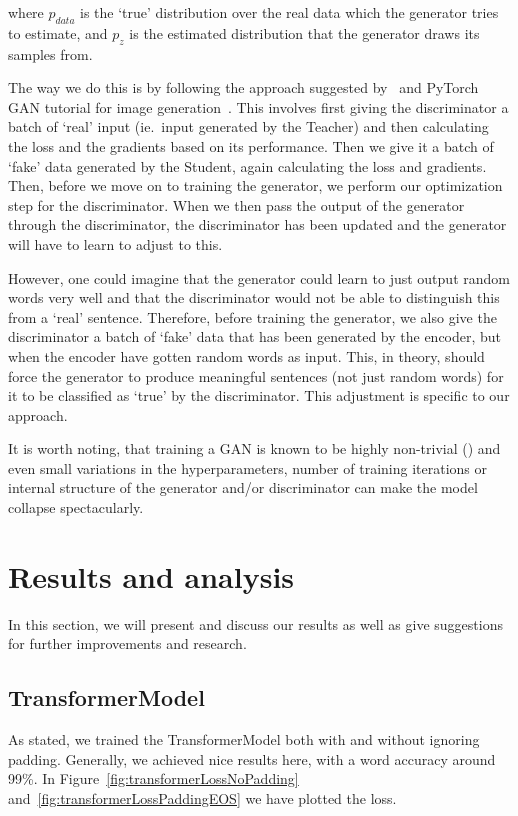 \documentclass{article}
\begin{document}
where $p_{data}$ is the `true' distribution over the real data which the
generator tries to estimate, and $p_z$ is the estimated distribution that the
generator draws its samples from.

The way we do this is by following the approach suggested
by~\cite{Goodfellow2014GenerativeAN} and PyTorch GAN tutorial for image
generation~\cite{pytorchTutorialGAN}. This involves first giving the
discriminator a batch of `real' input (ie.\ input generated by the Teacher) and
then calculating the loss and the gradients based on its performance. Then we
give it a batch of `fake' data generated by the Student, again calculating the
loss and gradients. Then, before we move on to training the generator, we
perform our optimization step for the discriminator. When we then pass the
output of the generator through the discriminator, the discriminator has been
updated and the generator will have to learn to adjust to this. 

However, one could imagine that the generator could learn to just output random
words very well and that the discriminator would not be able to distinguish this
from a `real' sentence. Therefore, before training the generator, we also give
the discriminator a batch of `fake' data that has been generated by the encoder,
but when the encoder have gotten random words as input. This, in theory, should
force the generator to produce meaningful sentences (not just random words) for
it to be classified as `true' by the discriminator. This adjustment is specific to
our approach.

It is worth noting, that training a GAN is known to be highly non-trivial
(\cite{Hui2018}) and even small variations in the hyperparameters, number of training
iterations or internal structure of the generator and/or discriminator can make
the model collapse spectacularly.

\section{Results and analysis}\label{sec:analysis}

In this section, we will present and discuss our results as well as give
suggestions for further improvements and research.

\subsection{TransformerModel}

As stated, we trained the TransformerModel both with and without ignoring
padding. Generally, we achieved nice results here, with a word accuracy around
99\%. In Figure~\ref{fig:transformerLossNoPadding}
and~\ref{fig:transformerLossPaddingEOS} we have plotted the loss.
\end{document}
